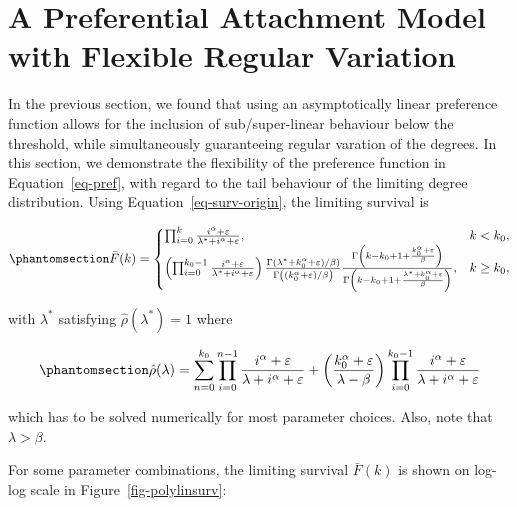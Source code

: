 \documentclass[
  sn-basic,
]{sn-jnl}
\theoremstyle{plain}
\theoremstyle{plain}
\theoremstyle{remark}
\begin{document}
\newpage

\section{A Preferential Attachment Model with Flexible Regular
Variation}\label{sec-model}

In the previous section, we found that using an asymptotically linear
preference function allows for the inclusion of sub/super-linear
behaviour below the threshold, while simultaneously guaranteeing regular
varation of the degrees. In this section, we demonstrate the flexibility
of the preference function in Equation~\ref{eq-pref}, with regard to the
tail behaviour of the limiting degree distribution. Using
Equation~\ref{eq-surv-origin}, the limiting survival is

\begin{equation}\phantomsection\label{eq-polysurv}{
\bar F(k) = \begin{cases}
\prod_{i=0}^{k}\frac{i^\alpha + \varepsilon}{\lambda^*+i^\alpha + \varepsilon},&k<k_0,\\
\left(\prod_{i=0}^{k_0-1}\frac{i^\alpha + \varepsilon}{\lambda^*+i^\alpha + \varepsilon}\right)\frac{\Gamma(\lambda^*+k_0^\alpha + \varepsilon)/\beta)}{\Gamma\left((k_0^\alpha + \varepsilon)/\beta\right)} \frac{\Gamma\left(k-k_0 + 1 +\frac{k_0^\alpha + \varepsilon}{\beta}\right)}{\Gamma\left(k-k_0 + 1 +\frac{\lambda^* +k_0^\alpha + \varepsilon}{\beta}\right)},&k\ge k_0,
\end{cases}
}\end{equation}

with \(\lambda^*\) satisfying \(\hat \rho(\lambda^*)=1\) where

\begin{equation}\phantomsection\label{eq-rho}{
\hat\rho(\lambda) = \sum_{n=0}^{k_0}\prod_{i=0}^{n-1}\frac{i^\alpha + \varepsilon}{\lambda+i^\alpha + \varepsilon} + \left(\frac{k_0^\alpha + \varepsilon}{\lambda-\beta}\right)\prod_{i=0}^{k_0-1}\frac{i^\alpha + \varepsilon}{\lambda + i^\alpha + \varepsilon} 
}\end{equation}

which has to be solved numerically for most parameter choices. Also,
note that \(\lambda>\beta\).

For some parameter combinations, the limiting survival \(\bar F(k)\) is
shown on log-log scale in Figure~\ref{fig-polylinsurv}:
\end{document}
